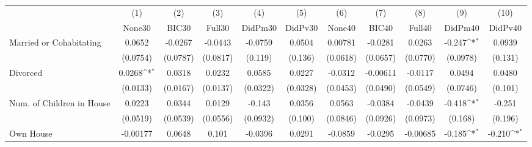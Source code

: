{
\def\sym#1{\ifmmode^{#1}\else\(^{#1}\)\fi}
\begin{tabular}{l*{10}{c}}
\toprule
            &\multicolumn{1}{c}{(1)}&\multicolumn{1}{c}{(2)}&\multicolumn{1}{c}{(3)}&\multicolumn{1}{c}{(4)}&\multicolumn{1}{c}{(5)}&\multicolumn{1}{c}{(6)}&\multicolumn{1}{c}{(7)}&\multicolumn{1}{c}{(8)}&\multicolumn{1}{c}{(9)}&\multicolumn{1}{c}{(10)}\\
            &\multicolumn{1}{c}{None30}&\multicolumn{1}{c}{BIC30}&\multicolumn{1}{c}{Full30}&\multicolumn{1}{c}{DidPm30}&\multicolumn{1}{c}{DidPv30}&\multicolumn{1}{c}{None40}&\multicolumn{1}{c}{BIC40}&\multicolumn{1}{c}{Full40}&\multicolumn{1}{c}{DidPm40}&\multicolumn{1}{c}{DidPv40}\\
\midrule
Married or Cohabitating&      0.0652         &     -0.0267         &     -0.0443         &     -0.0759         &      0.0504         &     0.00781         &     -0.0281         &      0.0263         &      -0.247\sym{*}  &      0.0939         \\
            &    (0.0754)         &    (0.0787)         &    (0.0817)         &     (0.119)         &     (0.136)         &    (0.0618)         &    (0.0657)         &    (0.0770)         &    (0.0978)         &     (0.131)         \\
\addlinespace
Divorced    &      0.0268\sym{*}  &      0.0318         &      0.0232         &      0.0585         &      0.0227         &     -0.0312         &    -0.00611         &     -0.0117         &      0.0494         &      0.0480         \\
            &    (0.0133)         &    (0.0167)         &    (0.0137)         &    (0.0322)         &    (0.0328)         &    (0.0453)         &    (0.0490)         &    (0.0549)         &    (0.0746)         &     (0.101)         \\
\addlinespace
Num. of Children in House&      0.0223         &      0.0344         &      0.0129         &      -0.143         &      0.0356         &      0.0563         &     -0.0384         &     -0.0439         &      -0.418\sym{*}  &      -0.251         \\
            &    (0.0519)         &    (0.0539)         &    (0.0556)         &    (0.0932)         &     (0.100)         &    (0.0846)         &    (0.0926)         &    (0.0973)         &     (0.168)         &     (0.196)         \\
\addlinespace
Own House   &    -0.00177         &      0.0648         &       0.101         &     -0.0396         &      0.0291         &     -0.0859         &     -0.0295         &    -0.00685         &      -0.185\sym{*}  &      -0.210\sym{*}  \\

\end{tabular}}
